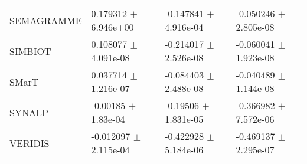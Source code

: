 \begin{tabular}{llll}
SEMAGRAMME  &   0.179312 $\pm$ 6.946e+00 &  -0.147841 $\pm$ 4.916e-04 &  -0.050246 $\pm$ 2.805e-08 \\
SIMBIOT     &   0.108077 $\pm$ 4.091e-08 &  -0.214017 $\pm$ 2.526e-08 &  -0.060041 $\pm$ 1.923e-08 \\
SMarT       &   0.037714 $\pm$ 1.216e-07 &  -0.084403 $\pm$ 2.488e-08 &  -0.040489 $\pm$ 1.144e-08 \\
SYNALP      &    -0.00185 $\pm$ 1.83e-04 &   -0.19506 $\pm$ 1.831e-05 &  -0.366982 $\pm$ 7.572e-06 \\
VERIDIS     &  -0.012097 $\pm$ 2.115e-04 &  -0.422928 $\pm$ 5.184e-06 &  -0.469137 $\pm$ 2.295e-07 \\
\bottomrule
\end{tabular}
